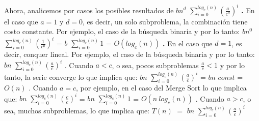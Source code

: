 \documentclass[10pt,a4paper]{article}
\begin{document}
Ahora, analicemos por casos los posibles resultados de $bn^{d}$ $\displaystyle \sum_{i=0}^{log_{c}(n)}  (\displaystyle \frac{a}{c^{d}})^{i}$ 
\newline
\newline
\textbf{.} En el caso que $a=1$ y $d=0$, es decir, un solo subproblema, la combinación tiene costo constante. Por ejemplo, el caso de la búsqueda binaria y por lo tanto:
\newline
\newline
\newline
$bn^{0}$ $\displaystyle \sum_{i=0}^{log_{c}(n)}  (\displaystyle \frac{1}{c^{0}})^{i}$ = $b$ $\displaystyle \sum_{i=0}^{log_{c}(n)} 1$ = $O(log_{c}(n))$   
\newline
\newline
\newline
\textbf{.} En el caso que $d=1$, es decir, conquer lineal. Por ejemplo, el caso de la búsqueda binaria y por lo tanto:
\newline
\newline
$bn$ $\displaystyle \sum_{i=0}^{log_{c}(n)}  (\displaystyle \frac{a}{c})^{i}$ 
\newline
\newline
{}. Cuando $a < c$, o sea, pocos subproblemas $\displaystyle \frac{a}{c} < 1$ y por lo tanto, la serie converge lo que implica que:
\newline
\newline
$bn$ $\displaystyle \sum_{i=0}^{log_{c}(n)}  (\displaystyle \frac{a}{c})^{i}$ = $bn$ $const$ = $O(n)$  
\newline
\newline
{}. Cuando $a = c$, por ejemplo, en el caso del Merge Sort lo que implica que:
\newline
\newline
$bn$ $\displaystyle \sum_{i=0}^{log_{c}(n)}  (\displaystyle \frac{c}{c})^{i}$ = $bn$ $\displaystyle \sum_{i=0}^{log_{c}(n)} 1$ = $O(n~log_{c}(n))$  
\newline
\newline
{}. Cuando $a > c$, o sea, muchos subproblemas, lo que implica que:
\newline
\newline
$T(n)$ $=$ $bn$ $\displaystyle \sum_{i=0}^{log_{c}(n)}  (\displaystyle \frac{a}{c})^{i}$ 
\newline
\newline
\end{document}
